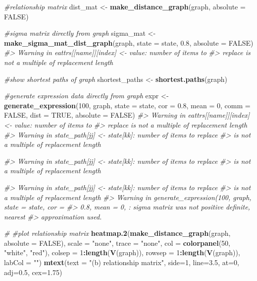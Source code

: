 \documentclass[]{article}
\newenvironment{Shaded}{\begin{snugshade}}{\end{snugshade}}
\newcommand{\CommentTok}[1]{\textcolor[rgb]{0.56,0.35,0.01}{\textit{#1}}}
\newcommand{\DataTypeTok}[1]{\textcolor[rgb]{0.13,0.29,0.53}{#1}}
\newcommand{\DecValTok}[1]{\textcolor[rgb]{0.00,0.00,0.81}{#1}}
\newcommand{\FloatTok}[1]{\textcolor[rgb]{0.00,0.00,0.81}{#1}}
\newcommand{\KeywordTok}[1]{\textcolor[rgb]{0.13,0.29,0.53}{\textbf{#1}}}
\newcommand{\NormalTok}[1]{#1}
\newcommand{\OperatorTok}[1]{\textcolor[rgb]{0.81,0.36,0.00}{\textbf{#1}}}
\newcommand{\OtherTok}[1]{\textcolor[rgb]{0.56,0.35,0.01}{#1}}
\newcommand{\StringTok}[1]{\textcolor[rgb]{0.31,0.60,0.02}{#1}}
\begin{document}
\begin{Shaded}
\begin{Highlighting}[]
{\CommentTok{#relationship matrix}
\NormalTok{dist_mat <-}\StringTok{ }\KeywordTok{make_distance_graph}\NormalTok{(graph, }\DataTypeTok{absolute =} \OtherTok{FALSE}\NormalTok{)}

\CommentTok{#sigma matrix directly from graph}
\NormalTok{sigma_mat <-}\StringTok{ }\KeywordTok{make_sigma_mat_dist_graph}\NormalTok{(graph, }\DataTypeTok{state =}\NormalTok{ state, }\FloatTok{0.8}\NormalTok{, }\DataTypeTok{absolute =} \OtherTok{FALSE}\NormalTok{)}
\CommentTok{#> Warning in eattrs[[name]][index] <- value: number of items to}
\CommentTok{#> replace is not a multiple of replacement length}

\CommentTok{#show shortest paths of graph}
\NormalTok{shortest_paths <-}\StringTok{ }\KeywordTok{shortest.paths}\NormalTok{(graph)}

\CommentTok{#generate expression data directly from graph}
\NormalTok{expr <-}\StringTok{ }\KeywordTok{generate_expression}\NormalTok{(}\DecValTok{100}\NormalTok{, graph, }\DataTypeTok{state =}\NormalTok{ state, }\DataTypeTok{cor =} \FloatTok{0.8}\NormalTok{, }\DataTypeTok{mean =} \DecValTok{0}\NormalTok{, }\DataTypeTok{comm =} \OtherTok{FALSE}\NormalTok{,}
                            \DataTypeTok{dist =} \OtherTok{TRUE}\NormalTok{, }\DataTypeTok{absolute =} \OtherTok{FALSE}\NormalTok{)}
\CommentTok{#> Warning in eattrs[[name]][index] <- value: number of items to}
\CommentTok{#> replace is not a multiple of replacement length}
\CommentTok{#> Warning in state_path[jj] <- state[kk]: number of items to replace}
\CommentTok{#> is not a multiple of replacement length}

\CommentTok{#> Warning in state_path[jj] <- state[kk]: number of items to replace}
\CommentTok{#> is not a multiple of replacement length}

\CommentTok{#> Warning in state_path[jj] <- state[kk]: number of items to replace}
\CommentTok{#> is not a multiple of replacement length}
\CommentTok{#> Warning in generate_expression(100, graph, state = state, cor =}
\CommentTok{#> 0.8, mean = 0, : sigma matrix was not positive definite, nearest}
\CommentTok{#> approximation used.}

\CommentTok{# #plot relationship matrix}
\KeywordTok{heatmap.2}\NormalTok{(}\KeywordTok{make_distance_graph}\NormalTok{(graph, }\DataTypeTok{absolute =} \OtherTok{FALSE}\NormalTok{),}
          \DataTypeTok{scale =} \StringTok{"none"}\NormalTok{, }\DataTypeTok{trace =} \StringTok{"none"}\NormalTok{, }\DataTypeTok{col =} \KeywordTok{colorpanel}\NormalTok{(}\DecValTok{50}\NormalTok{, }\StringTok{"white"}\NormalTok{, }\StringTok{"red"}\NormalTok{),}
\DataTypeTok{colsep =} \DecValTok{1}\OperatorTok{:}\KeywordTok{length}\NormalTok{(}\KeywordTok{V}\NormalTok{(graph)), }\DataTypeTok{rowsep =} \DecValTok{1}\OperatorTok{:}\KeywordTok{length}\NormalTok{(}\KeywordTok{V}\NormalTok{(graph)), }\DataTypeTok{labCol =} \StringTok{""}\NormalTok{)}
\KeywordTok{mtext}\NormalTok{(}\DataTypeTok{text =} \StringTok{"(b) relationship matrix"}\NormalTok{, }\DataTypeTok{side=}\DecValTok{1}\NormalTok{, }\DataTypeTok{line=}\FloatTok{3.5}\NormalTok{, }\DataTypeTok{at=}\DecValTok{0}\NormalTok{, }\DataTypeTok{adj=}\FloatTok{0.5}\NormalTok{, }\DataTypeTok{cex=}\FloatTok{1.75}\NormalTok{)}

}
\end{Highlighting}
\end{Shaded}
\end{document}
